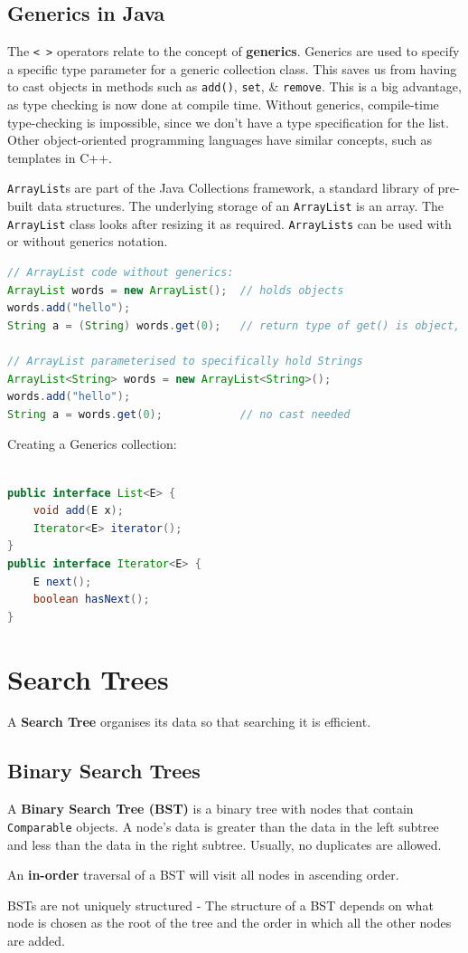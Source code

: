 \documentclass[11pt]{article}
\begin{document}
\subsection{Generics in Java} 
The \verb|< >| operators relate to the concept of \textbf{generics}. 
Generics are used to specify a specific type parameter for a generic collection class. 
This saves us from having to cast objects in methods such as \verb|add()|, \verb|set|, \& \verb|remove|.
This is a big advantage, as type checking is now done at compile time.
Without generics, compile-time type-checking is impossible, since we don't have a type specification for the list.
Other object-oriented programming languages have similar concepts, such as templates in C++.

\verb|ArrayList|s are part of the Java Collections framework, a standard library of pre-built data structures.
The underlying storage of an \verb|ArrayList| is an array. 
The \verb|ArrayList| class looks after resizing it as required.
\verb|ArrayLists| can be used with or without generics notation.

\begin{lstlisting}[language=Java]
// ArrayList code without generics: 
ArrayList words = new ArrayList();  // holds objects 
words.add("hello"); 
String a = (String) words.get(0);   // return type of get() is object, so must cast to String

// ArrayList parameterised to specifically hold Strings 
ArrayList<String> words = new ArrayList<String>(); 
words.add("hello"); 
String a = words.get(0);            // no cast needed
\end{lstlisting}

Creating a Generics collection: 
\begin{lstlisting}[language=Java]

public interface List<E> {
    void add(E x);
    Iterator<E> iterator();
}
public interface Iterator<E> {
    E next();
    boolean hasNext();
}
\end{lstlisting}

\section{Search Trees}
A \textbf{Search Tree} organises its data so that searching it is efficient.

\subsection{Binary Search Trees}
A \textbf{Binary Search Tree (BST)} is a binary tree with nodes that contain \verb|Comparable| objects. 
A node's data is greater than the data in the left subtree and less than the data in the right subtree. 
Usually, no duplicates are allowed. 

An \textbf{in-order} traversal of a BST will visit all nodes in ascending order.

BSTs are not uniquely structured - The structure of a BST depends on what node is chosen as the root of the tree and the order in which all the other nodes are added.



\end{document}
